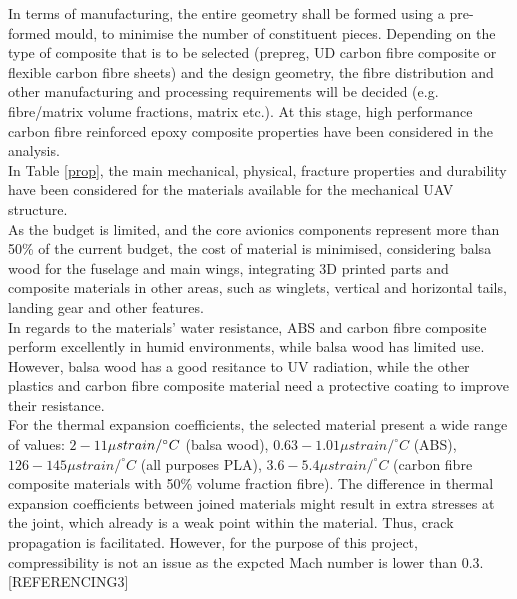 \documentclass[12pt]{article}
\begin{document}
\noindent In terms of manufacturing, the entire geometry shall be formed using a pre-formed mould, to minimise the number of constituent pieces. Depending on the type of composite that is to be selected (prepreg, UD carbon fibre composite or flexible carbon fibre sheets) and the design geometry, the fibre distribution and other manufacturing and processing requirements will be decided (e.g.  fibre/matrix volume fractions, matrix etc.). At this stage, high performance carbon fibre reinforced epoxy composite properties have been considered in the analysis. \\

\noindent In Table \ref{prop}, the main mechanical, physical, fracture properties and durability have been considered for the materials available for the mechanical UAV structure. \\  

\noindent As the budget is limited, and the core avionics components represent more than 50\% of the current budget, the cost of material is minimised, considering balsa wood for the fuselage and main wings, integrating 3D printed parts and composite materials in other areas, such as winglets, vertical and horizontal tails, landing gear and other features. \\

\noindent In regards to the materials' water resistance, ABS and carbon fibre composite perform excellently in humid environments, while balsa wood has limited use. However, balsa wood has a good resitance to UV radiation, while the other plastics and carbon fibre composite material need a protective coating to improve their resistance. \\

\noindent For the thermal expansion coefficients, the selected material present a wide range of values: $2 - 11\mu$$strain/ \\ ^{\circ}C$ (balsa wood), $0.63 - 1.01\mu$$strain/^{\circ}C$ (ABS), $126 - 145\mu$$strain/^{\circ}C$ (all purposes PLA), $3.6 - 5.4\mu$$strain/ ^{\circ}C$ (carbon fibre composite materials with 50\% volume fraction fibre). The difference in thermal expansion coefficients between joined materials might result in extra stresses at the joint, which already is a weak point within the material. Thus, crack propagation is facilitated. However, for the purpose of this project, compressibility is not an issue as the expcted Mach number is lower than 0.3.[REFERENCING3] \\
\end{document}
